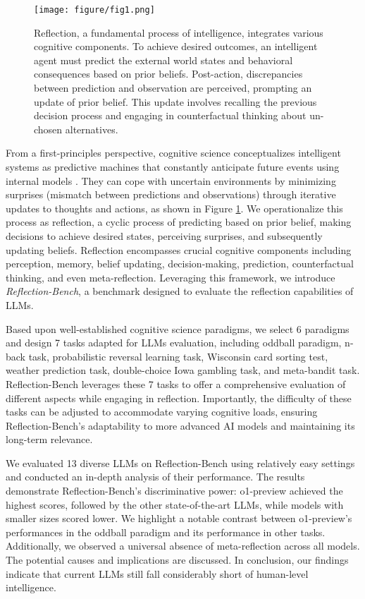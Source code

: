 \begin{figure}
    \centering
    \texttt{[image: figure/fig1.png]}
    \caption{Reflection, a fundamental process of intelligence, integrates various cognitive components. To achieve desired outcomes, an intelligent agent must predict the external world states and behavioral consequences based on prior beliefs. Post-action, discrepancies between prediction and observation are perceived, prompting an update of prior belief. This update involves recalling the previous decision process and engaging in counterfactual thinking about un-chosen alternatives.}
    \label{fig1}
\end{figure}

From a first-principles perspective, cognitive science conceptualizes intelligent systems as predictive machines that constantly anticipate future events using internal models \cite{friston2010free}. They can cope with uncertain environments by minimizing surprises (mismatch between predictions and observations) through iterative updates to thoughts and actions, as shown in Figure \ref{fig1}. We operationalize this process as reflection, a cyclic process of predicting based on prior belief, making decisions to achieve desired states, perceiving surprises, and subsequently updating beliefs. Reflection encompasses crucial cognitive components including perception, memory, belief updating, decision-making, prediction, counterfactual thinking, and even meta-reflection. Leveraging this framework, we introduce \emph{Reflection-Bench}, a benchmark designed to evaluate the reflection capabilities of LLMs.

Based upon well-established cognitive science paradigms, we select 6 paradigms and design 7 tasks adapted for LLMs evaluation, including oddball paradigm, n-back task, probabilistic reversal learning task, Wisconsin card sorting test, weather prediction task, double-choice Iowa gambling task, and meta-bandit task. Reflection-Bench leverages these 7 tasks to offer a comprehensive evaluation of different aspects while engaging in reflection. Importantly, the difficulty of these tasks can be adjusted to accommodate varying cognitive loads, ensuring Reflection-Bench's adaptability to more advanced AI models and maintaining its long-term relevance.

We evaluated 13 diverse LLMs on Reflection-Bench using relatively easy settings and conducted an in-depth analysis of their performance. The results demonstrate Reflection-Bench's discriminative power: o1-preview achieved the highest scores, followed by the other state-of-the-art LLMs, while models with smaller sizes scored lower. We highlight a notable contrast between o1-preview's performances in the oddball paradigm and its performance in other tasks. Additionally, we observed a universal absence of meta-reflection across all models. The potential causes and implications are discussed. In conclusion, our findings indicate that current LLMs still fall considerably short of human-level intelligence.

